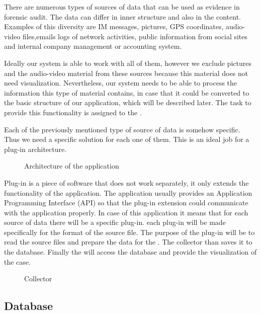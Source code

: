 There are numerous types of sources of data that can be used as evidence in forensic audit. The data can differ in inner structure and also in the content. Examples of this diversity are IM messages, pictures, GPS coordinates, audio-video files,emails logs of network activities, public information from social sites and internal company management or accounting system.

Ideally our system is able to work with all of them, however we exclude pictures and the audio-video material from these sources because this material does not need visualization. Nevertheless, our system needs to be able to process the information this type of material contains, in case that it could be converted to the basic structure of our application, which will be described later. The task to provide this functionality is assigned to the .

Each of the previously mentioned type of source of data is somehow specific. Thus we need a specific solution for each one of them. This is an ideal job for a plug-in architecture. 

\begin{figure}[!h]
    \centering 
    \epsfysize=60mm 
    \caption{Architecture of the application}\label{Architecture}
\end{figure}

Plug-in is a piece of software that does not work separately, it only extends the functionality of the application. The application usually provides an Application Programming Interface (API) so that the plug-in extension could communicate with the application properly. In case of this application it means that for each source of data there will be a specific plug-in. each plug-in will be made specifically for the format of the source file. The purpose of the plug-in will be to read the source files and prepare the data for the . The collector than saves it to the database. Finally the  will access the database and provide the visualization of the case.

\begin{figure}[!h]
    \centering 
    \epsfysize=60mm 
    \caption{Collector}\label{Collector}
\end{figure}

\subsection{Database}
